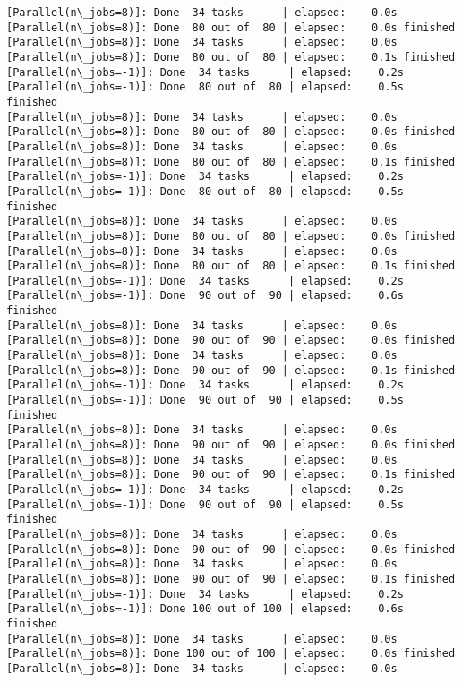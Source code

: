 \documentclass[11pt]{article}
\begin{document}
\begin{Verbatim}[commandchars=\\\{\}]
[Parallel(n\_jobs=8)]: Done  34 tasks      | elapsed:    0.0s
[Parallel(n\_jobs=8)]: Done  80 out of  80 | elapsed:    0.0s finished
[Parallel(n\_jobs=8)]: Done  34 tasks      | elapsed:    0.0s
[Parallel(n\_jobs=8)]: Done  80 out of  80 | elapsed:    0.1s finished
[Parallel(n\_jobs=-1)]: Done  34 tasks      | elapsed:    0.2s
[Parallel(n\_jobs=-1)]: Done  80 out of  80 | elapsed:    0.5s finished
[Parallel(n\_jobs=8)]: Done  34 tasks      | elapsed:    0.0s
[Parallel(n\_jobs=8)]: Done  80 out of  80 | elapsed:    0.0s finished
[Parallel(n\_jobs=8)]: Done  34 tasks      | elapsed:    0.0s
[Parallel(n\_jobs=8)]: Done  80 out of  80 | elapsed:    0.1s finished
[Parallel(n\_jobs=-1)]: Done  34 tasks      | elapsed:    0.2s
[Parallel(n\_jobs=-1)]: Done  80 out of  80 | elapsed:    0.5s finished
[Parallel(n\_jobs=8)]: Done  34 tasks      | elapsed:    0.0s
[Parallel(n\_jobs=8)]: Done  80 out of  80 | elapsed:    0.0s finished
[Parallel(n\_jobs=8)]: Done  34 tasks      | elapsed:    0.0s
[Parallel(n\_jobs=8)]: Done  80 out of  80 | elapsed:    0.1s finished
[Parallel(n\_jobs=-1)]: Done  34 tasks      | elapsed:    0.2s
[Parallel(n\_jobs=-1)]: Done  90 out of  90 | elapsed:    0.6s finished
[Parallel(n\_jobs=8)]: Done  34 tasks      | elapsed:    0.0s
[Parallel(n\_jobs=8)]: Done  90 out of  90 | elapsed:    0.0s finished
[Parallel(n\_jobs=8)]: Done  34 tasks      | elapsed:    0.0s
[Parallel(n\_jobs=8)]: Done  90 out of  90 | elapsed:    0.1s finished
[Parallel(n\_jobs=-1)]: Done  34 tasks      | elapsed:    0.2s
[Parallel(n\_jobs=-1)]: Done  90 out of  90 | elapsed:    0.5s finished
[Parallel(n\_jobs=8)]: Done  34 tasks      | elapsed:    0.0s
[Parallel(n\_jobs=8)]: Done  90 out of  90 | elapsed:    0.0s finished
[Parallel(n\_jobs=8)]: Done  34 tasks      | elapsed:    0.0s
[Parallel(n\_jobs=8)]: Done  90 out of  90 | elapsed:    0.1s finished
[Parallel(n\_jobs=-1)]: Done  34 tasks      | elapsed:    0.2s
[Parallel(n\_jobs=-1)]: Done  90 out of  90 | elapsed:    0.5s finished
[Parallel(n\_jobs=8)]: Done  34 tasks      | elapsed:    0.0s
[Parallel(n\_jobs=8)]: Done  90 out of  90 | elapsed:    0.0s finished
[Parallel(n\_jobs=8)]: Done  34 tasks      | elapsed:    0.0s
[Parallel(n\_jobs=8)]: Done  90 out of  90 | elapsed:    0.1s finished
[Parallel(n\_jobs=-1)]: Done  34 tasks      | elapsed:    0.2s
[Parallel(n\_jobs=-1)]: Done 100 out of 100 | elapsed:    0.6s finished
[Parallel(n\_jobs=8)]: Done  34 tasks      | elapsed:    0.0s
[Parallel(n\_jobs=8)]: Done 100 out of 100 | elapsed:    0.0s finished
[Parallel(n\_jobs=8)]: Done  34 tasks      | elapsed:    0.0s

\end{Verbatim}
\end{document}
